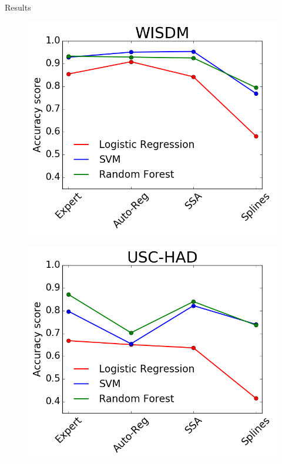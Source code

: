 \documentclass{beamer}
\begin{document}
\begin{frame}{Results}
	\begin{minipage}[t]{0.49\columnwidth}
		\begin{figure}[h]
			\centering
			\includegraphics[width=1.05\linewidth]{wisdm_methods.png}
		\end{figure}
	\end{minipage}
	\hfill
	\begin{minipage}[t]{0.49\columnwidth}
		\begin{figure}[h]
			\centering
			\includegraphics[width=1.05\linewidth]{uschad_methods.png}

\end{figure}
\end{minipage}
\end{frame}
\end{document}
